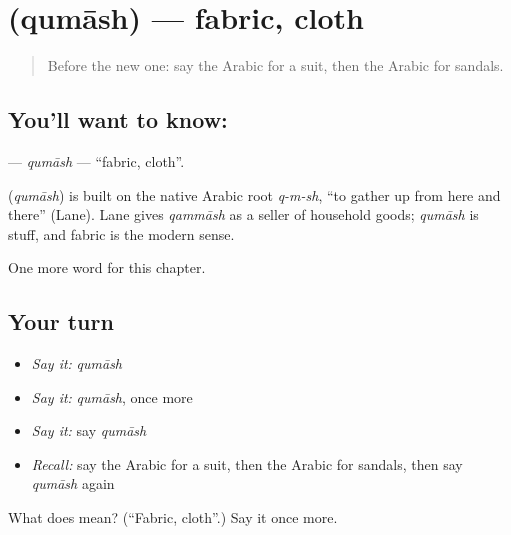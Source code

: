 \section[\texorpdfstring{\ar{قماش} (qumāsh)}{قماش (qumāsh)}]{ (qumāsh) — fabric, cloth}

\label{lesson:AR-C214-qumash}



\begin{quote}
Before the new one: say the Arabic for a suit, then the Arabic for sandals.
\end{quote}

\subsection*{You'll want to know: }
\textbf{} — \emph{qumāsh} — \textquotedblleft{}fabric, cloth\textquotedblright{}.

\begin{cousinweb}
\textbf{} (\emph{qumāsh}) is built on the native Arabic root \emph{q-m-sh}, \textquotedblleft{}to gather up from here and there\textquotedblright{} (Lane). Lane gives \emph{qammāsh} as a seller of household goods; \emph{qumāsh} is stuff, and fabric is the modern sense.
\end{cousinweb}

\begin{grammarlens}[title={What you've built}]
One more word for this chapter.
\end{grammarlens}

\subsection*{Your turn}
\begin{itemize}
\raggedright
  \item \emph{Say it:} \emph{qumāsh}
  \item \emph{Say it:} \emph{qumāsh}, once more
  \item \emph{Say it:} say \emph{qumāsh}
  \item \emph{Recall:} say the Arabic for a suit, then the Arabic for sandals, then say \emph{qumāsh} again
\end{itemize}

\begin{tcolorbox}[breakable,colback=teal!4,colframe=teal!35!black,title={Before you move on}]
What does  mean? (\textquotedblleft{}Fabric, cloth\textquotedblright{}.) Say it once more.
\end{tcolorbox}
